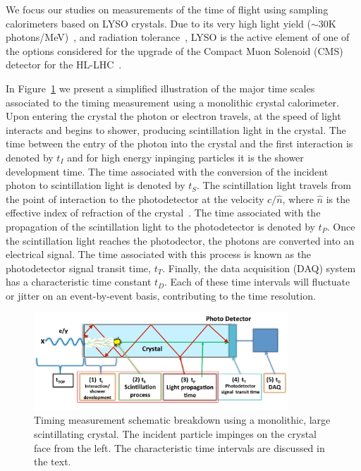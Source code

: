 \documentclass[12pt]{article}
\begin{document}
We focus our studies on measurements of the time of flight using sampling calorimeters 
based on LYSO crystals. Due to its very high light yield ($\sim 30$K photons/MeV)~\cite{LYSOProperties}, and
radiation tolerance~\cite{5402126, 4291695, 5402125, Dissertori:2013rma}, LYSO
is the active element of one of the options considered for the upgrade of the
Compact Muon Solenoid (CMS) detector for the HL-LHC~\cite{Contardo:1605208}. 

In Figure~\ref{fig:ScintillatorTiming} we present a simplified illustration of
the major time scales associated to the timing measurement using a monolithic
crystal calorimeter. Upon entering the crystal the photon or electron travels,
at the speed of light interacts and begins to shower, producing scintillation light in the crystal. 
The time between the entry of the photon into the crystal and the first interaction is denoted by
$t_I$ and for high energy inpinging particles it is the shower development time. 
The time associated with the conversion of the incident photon to
scintillation light is denoted by $t_S$. The scintillation light travels from
the point of interaction to the photodetector at the velocity $c/\hat{n}$, where
$\hat{n}$ is the effective index of refraction of the crystal~\cite{Moses}. The
time associated with the propagation of the scintillation light to the photodetector 
is denoted by $t_P$. Once the scintillation light reaches the photodector, the  photons are converted into an
electrical signal. The time associated with this process is known as the
photodetector signal transit time, $t_T$. Finally, the data acquisition (DAQ)
system has a characteristic time constant $t_D$. Each of these time intervals will fluctuate or jitter on an event-by-event basis, contributing to the time resolution.


\begin{figure}[h] \centering
\includegraphics[width=0.85\textwidth]{figs/ScintillatorTiming_v3}
\caption{\small Timing measurement schematic breakdown using a monolithic, large scintillating crystal. 
The incident particle impinges on the crystal face from the left. The characteristic time intervals  are discussed 
in the text.}
\label{fig:ScintillatorTiming}
\end{figure}
\end{document}
